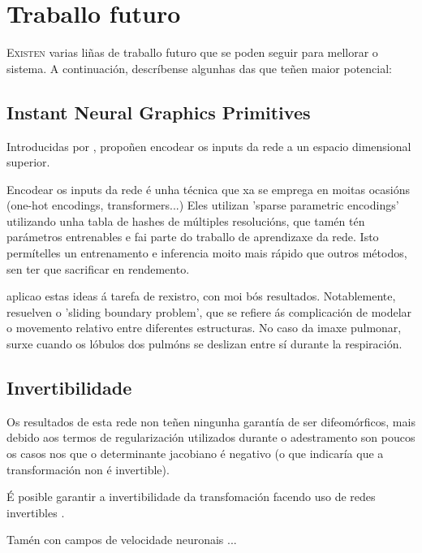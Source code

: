 \chapter{Traballo futuro}
\label{chap:Traballo futuro}

\lettrine{E}{xisten} varias liñas de traballo futuro que se poden seguir para mellorar o sistema.
A continuación, descríbense algunhas das que teñen maior potencial:

\section{Instant Neural Graphics Primitives}
\label{sec:Instant Neural Graphics Primitives}

Introducidas por \cite{mueller2022instant}, propoñen encodear os inputs da rede a un espacio dimensional superior.

Encodear os inputs da rede é unha técnica que xa se emprega en moitas ocasións (one-hot encodings, transformers...)
Eles utilizan 'sparse parametric encodings' utilizando unha tabla de hashes de múltiples resolucións, que tamén tén parámetros entrenables e fai parte do traballo de aprendizaxe da rede.
Isto permítelles un entrenamento e inferencia moito mais rápido que outros métodos, sen ter que sacrificar en rendemento.

\cite{li2024neuralgraphicsprimitivesdeformable} aplicao estas ideas á tarefa de rexistro, con moi bós resultados.
Notablemente, resuelven o 'sliding boundary problem', que se refiere ás complicación de modelar o movemento relativo entre diferentes estructuras. 
No caso da imaxe pulmonar, surxe cuando os lóbulos dos pulmóns se deslizan entre sí durante la respiración.



\section{Invertibilidade}
\label{sec:Invertibilidade}

Os resultados de esta rede non teñen ningunha garantía de ser difeomórficos, 
mais debido aos termos de regularización utilizados durante o adestramento son poucos os casos nos que o determinante jacobiano é negativo (o que indicaría que a transformación non é invertible).

É posible garantir a invertibilidade da transfomación facendo uso de redes invertibles \cite{jacobsen2018irevnetdeepinvertiblenetworks}.

Tamén con campos de velocidade neuronais \cite{sun2024medicalimageregistrationneural} ...